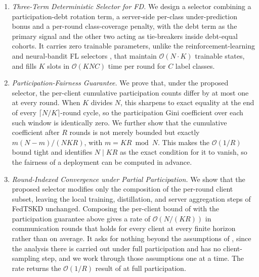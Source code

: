 \documentclass[journal]{IEEEtran}
\newcommand{\rev}[1]{#1}
\begin{document}
\begin{enumerate}
    \item \textit{Three-Term Deterministic Selector for FD.} We design a selector combining a participation-debt rotation term, a server-side per-class under-prediction bonus and a per-round class-coverage penalty, with the debt term as the primary signal and the other two acting as tie-breakers inside debt-equal cohorts. It carries zero trainable parameters, unlike the reinforcement-learning and neural-bandit FL selectors \rev{\cite{kazemi2026robust}, \cite{xia2020mab}} that maintain $\mathcal{O}(N\cdot K)$ trainable states, and fills $K$ slots in $\mathcal{O}(KNC)$ time per round for $C$ label classes.

    \item \textit{Participation-Fairness Guarantee.} We prove that, under the proposed selector, the per-client cumulative participation counts differ by at most one at every round. When $K$ divides $N$, this sharpens to exact equality at the end of every $\lceil N/K \rceil$-round cycle, so the participation Gini coefficient over each such window is identically zero. \rev{We further show that the cumulative coefficient after $R$ rounds is not merely bounded but exactly $m(N-m)/(NKR)$, with $m = KR \bmod N$. This makes the $\mathcal{O}(1/R)$ bound tight and identifies $N \mid KR$ as the exact condition for it to vanish, so the fairness of a deployment can be computed in advance.}

    \item \textit{\rev{Round-Indexed Convergence under Partial Participation.}} We show that the proposed selector modifies only the composition of the per-round client subset, leaving the local training, distillation, and server aggregation steps of FedTSKD \cite{mu2024fedtskd} unchanged. \rev{Composing the per-client bound of \cite{mu2024fedtskd} with the participation guarantee above gives a rate of $\mathcal{O}(N/(KR))$ in communication rounds that holds for every client at every finite horizon rather than on average. It asks for nothing beyond the assumptions of \cite{mu2024fedtskd}, since the analysis there is carried out under full participation and has no client-sampling step, and we work through those assumptions one at a time. The rate returns the $\mathcal{O}(1/R)$ result of \cite{mu2024fedtskd} at full participation.}


\end{enumerate}
\end{document}
